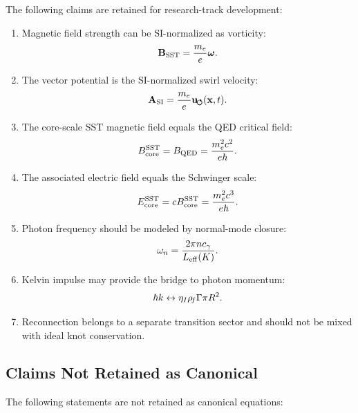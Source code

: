     The following claims are retained for research-track development:
    
    \begin{enumerate}
        \item Magnetic field strength can be SI-normalized as vorticity:
        \[
            \mathbf{B}_{\rm SST}
            =
            \frac{m_e}{e}\boldsymbol{\omega}.
        \]
        
        \item The vector potential is the SI-normalized swirl velocity:
        \[
            \mathbf{A}_{\rm SI}
            =
            \frac{m_e}{e}\mathbf{u}_{\!\boldsymbol{\circlearrowleft}}(\mathbf{x},t).
        \]
        
        \item The core-scale SST magnetic field equals the QED critical field:
        \[
            B_{\rm core}^{\rm SST}
            =
            B_{\rm QED}
            =
            \frac{m_e^2c^2}{e\hbar}.
        \]
        
        \item The associated electric field equals the Schwinger scale:
        \[
            E_{\rm core}^{\rm SST}
            =
            cB_{\rm core}^{\rm SST}
            =
            \frac{m_e^2c^3}{e\hbar}.
        \]
        
        \item Photon frequency should be modeled by normal-mode closure:
        \[
            \omega_n
            =
            \frac{2\pi n c_\gamma}{L_{\rm eff}(K)}.
        \]
        
        \item Kelvin impulse may provide the bridge to photon momentum:
        \[
            \hbar k
            \leftrightarrow
            \eta_I\rho_{\!f}\Gamma\pi R^2.
        \]
        
        \item Reconnection belongs to a separate transition sector and should
        not be mixed with ideal knot conservation.
    \end{enumerate}

\subsection{Claims Not Retained as Canonical}
    
    The following statements are not retained as canonical equations:
    
